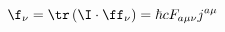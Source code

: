 \begin{equation}
  \label{eq:ftrIf}
  \f_\nu = \tr\left(\I \cdot \ff_\nu \right)=\hbar c  F_{a \mu \nu} j^{a \mu}
\end{equation}

